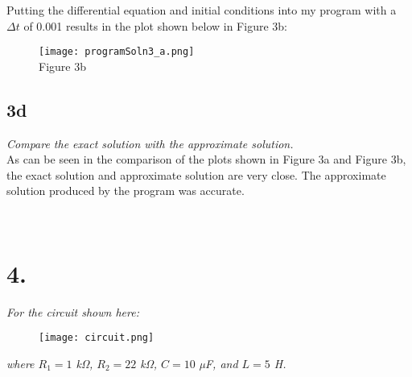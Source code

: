 \documentclass[10pt, AMS Euler]{article}
\begin{document}
Putting the differential equation and initial conditions into my program with a $\Delta t$ of 0.001 results in the plot shown below in Figure 3b:

\begin{figure}[H]
    \centering
    \texttt{[image: programSoln3\_a.png]}\\
    Figure 3b
\end{figure}

\subsection*{3d}
\textit{Compare the exact solution with the approximate solution.}\\

As can be seen in the comparison of the plots shown in Figure 3a and Figure 3b, the exact solution and approximate solution are very close. The approximate solution produced by the program was accurate.


\noindent \underline{\hspace{7in}}\\
\section*{4.}
\textit{For the circuit shown here:}
\begin{figure}[H]
    \centering
    \texttt{[image: circuit.png]}
\end{figure}

\textit{where $R_1 = 1$ kΩ, $R_2 = 22$ kΩ, $C = 10$ µF, and $L = 5$ H.}






\noindent \underline{\hspace{7in}}\\
\end{document}
